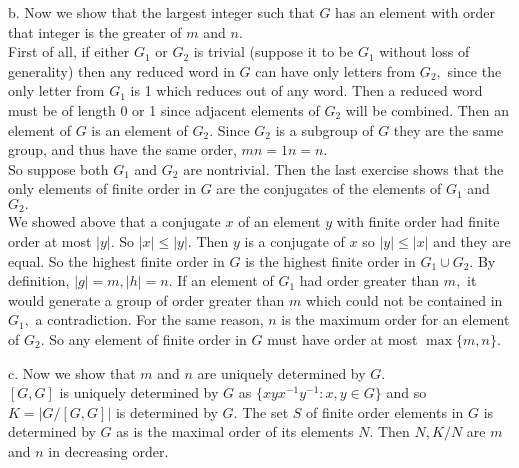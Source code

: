 \documentclass{article}
\begin{document}
b. Now we show that the largest integer such that $G$ has an element with order that integer is the greater of $m$ and $n.$
\\
First of all, if either $G_1$ or $G_2$ is trivial (suppose it to be $G_1$ without loss of generality) then any reduced word in $G$ can have only letters from $G_2,$ since the only letter from $G_1$ is 1 which reduces out of any word.  Then a reduced word must be of length 0 or 1 since adjacent elements of $G_2$ will be combined.  Then an element of $G$ is an element of $G_2.$  Since $G_2$ is a subgroup of $G$ they are the same group, and thus have the same order, $mn=1n=n.$
\\
So suppose both $G_1$ and $G_2$ are nontrivial.  Then the last exercise shows that the only elements of finite order in $G$ are the conjugates of the elements of $G_1$ and $G_2.$
\\
We showed above that a conjugate $x$ of an element $y$ with finite order had finite order at most $|y|.$  So $|x|\le |y|.$  Then $y$ is a conjugate of $x$ so $|y|\le |x|$ and they are equal.  So the highest finite order in $G$ is the highest finite order in $G_1\cup G_2.$  By definition, $|g|=m,|h|=n.$  If an element of $G_1$ had order greater than $m,$ it would generate a group of order greater than $m$ which could not be contained in $G_1,$ a contradiction.  For the same reason, $n$ is the maximum order for an element of $G_2.$  So any element of finite order in $G$ must have order at most $\max\{m,n\}.$

c. Now we show that $m$ and $n$ are uniquely determined by $G.$
\\
$[G,G]$ is uniquely determined by $G$ as $\{xyx^{-1}y^{-1}:x,y\in G\}$ and so $K=|G/[G,G]|$ is determined by $G.$  The set $S$ of finite order elements in $G$ is determined by $G$ as is the maximal order of its elements $N.$  Then $N,K/N$ are $m$ and $n$ in decreasing order.
\end{document}
